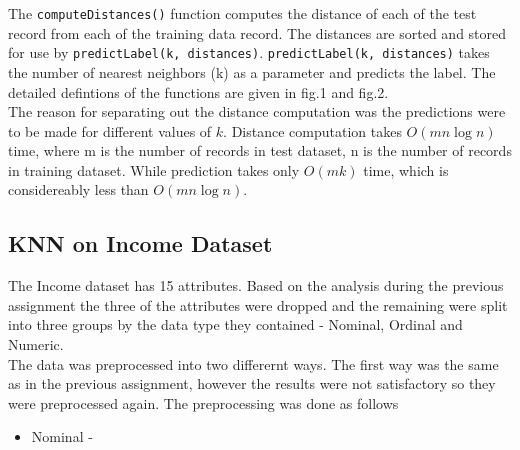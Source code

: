 The \texttt{computeDistances()} function computes the distance of each of the test record from each of the training data record. The distances are sorted and stored for use by \texttt{predictLabel(k, distances)}. \texttt{predictLabel(k, distances)} takes the number of nearest neighbors (k) as a parameter and predicts the label. The detailed defintions of the functions are given in fig.1 and fig.2. \\

The reason for separating out the distance computation was the predictions were to be made for different values of $k$. Distance computation takes $O(mn\log n)$ time, where m is the number of records in test dataset, n is the number of records in training dataset. While prediction takes only $O(mk)$ time, which is considereably less than $O(mn\log n)$.\\

\subsection{KNN on Income Dataset}
The Income dataset has 15 attributes. Based on the analysis during the previous assignment the three of the attributes were dropped and the remaining were split into three groups by the data type they contained - Nominal, Ordinal and Numeric.\\
The data was preprocessed into two differernt ways. The first way was the same as in the previous assignment, however the results were not satisfactory so they were preprocessed again.
The preprocessing was done as follows
\begin{itemize}
\item Nominal - 
\end{itemize}
